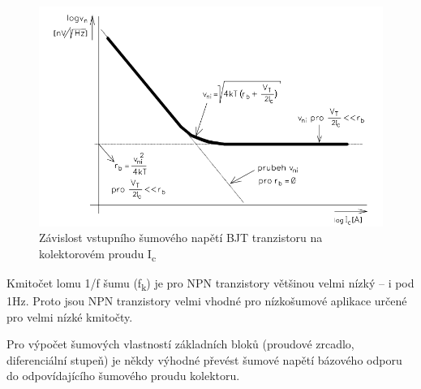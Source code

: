 \begin{figure}[h]
   \begin{center}
     \includegraphics[scale=0.5]{images/grafBJT.png}
   \end{center}
   \caption{ Závislost vstupního šumového napětí BJT tranzistoru na kolektorovém proudu I\textsubscript{c}}
\end{figure}

Kmitočet lomu 1/f šumu (f\textsubscript{k}) je pro NPN tranzistory většinou velmi nízký – i pod 1Hz. Proto jsou NPN tranzistory velmi vhodné pro nízkošumové aplikace určené pro velmi nízké
kmitočty. 

Pro výpočet šumových vlastností základních bloků (proudové zrcadlo, diferenciální stupeň) je někdy výhodné převést šumové napětí bázového odporu do odpovídajícího šumového proudu kolektoru.

